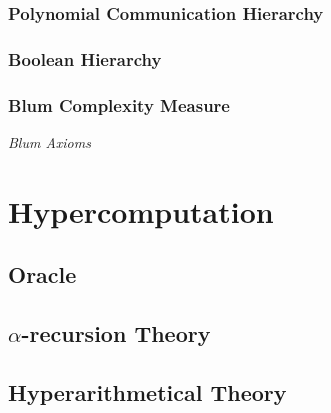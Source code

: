 \documentclass{article}
\begin{document}
\subsubsection{Polynomial Communication Hierarchy}

\subsubsection{Boolean Hierarchy}




\subsubsection{Blum Complexity Measure}

\emph{Blum Axioms}



\section{Hypercomputation}\label{sec:hypercomputation}

\subsection{Oracle}\label{sec:oracle}

\subsection{$\alpha$-recursion Theory}\label{subsec:alpha_recursion}

\subsection{Hyperarithmetical Theory}\label{subsec:hyperarithmetical_theory}



\end{document}
